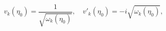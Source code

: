 \begin{equation}\label{eq:diagonalization}
  v_k(\eta_0)=\frac{1}{\sqrt{\omega_k(\eta_0)}},\quad
  v'_k(\eta_0)=-i \sqrt{\omega_k(\eta_0)},
\end{equation}

